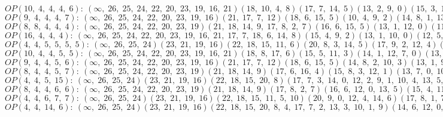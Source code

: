 $OP(10, \;4, \;4, \;4, \;6): \:(\infty, \;26, \;25, \;24, \;22, \;20, \;23, \;19, \;16, \;21)(18, \;10, \;4, \;8)(17, \;7, \;14, \;5)(13, \;2, \;9, \;0)(15, \;3, \;11, \;6, \;12, \;1)$\\
$OP(9, \;4, \;4, \;4, \;7): \:(\infty, \;26, \;25, \;24, \;22, \;20, \;23, \;19, \;16)(21, \;17, \;7, \;12)(18, \;6, \;15, \;5)(10, \;4, \;9, \;2)(14, \;8, \;1, \;13, \;0, \;11, \;3)$\\
$OP(8, \;8, \;4, \;4, \;4): \:(\infty, \;26, \;25, \;24, \;22, \;20, \;23, \;19)(21, \;18, \;14, \;9, \;17, \;8, \;2, \;7)(16, \;6, \;15, \;5)(13, \;1, \;12, \;0)(11, \;4, \;10, \;3)$\\
$OP(16, \;4, \;4, \;4): \:(\infty, \;26, \;25, \;24, \;22, \;20, \;23, \;19, \;16, \;21, \;17, \;7, \;18, \;6, \;14, \;8)(15, \;4, \;9, \;2)(13, \;1, \;10, \;0)(12, \;5, \;11, \;3)$\\
$OP(4, \;4, \;5, \;5, \;5, \;5): \:(\infty, \;26, \;25, \;24)(23, \;21, \;19, \;16)(22, \;18, \;15, \;11, \;6)(20, \;8, \;3, \;14, \;5)(17, \;9, \;2, \;12, \;4)(13, \;7, \;1, \;10, \;0)$\\
$OP(10, \;4, \;4, \;5, \;5): \:(\infty, \;26, \;25, \;24, \;22, \;20, \;23, \;19, \;16, \;21)(18, \;8, \;17, \;6)(15, \;5, \;11, \;3)(14, \;1, \;12, \;7, \;0)(13, \;9, \;2, \;10, \;4)$\\
$OP(9, \;4, \;4, \;5, \;6): \:(\infty, \;26, \;25, \;24, \;22, \;20, \;23, \;19, \;16)(21, \;17, \;7, \;12)(18, \;6, \;15, \;5)(14, \;8, \;2, \;10, \;3)(13, \;1, \;9, \;4, \;11, \;0)$\\
$OP(8, \;4, \;4, \;5, \;7): \:(\infty, \;26, \;25, \;24, \;22, \;20, \;23, \;19)(21, \;18, \;14, \;9)(17, \;6, \;16, \;4)(15, \;8, \;3, \;12, \;1)(13, \;7, \;0, \;10, \;2, \;11, \;5)$\\
$OP(4, \;4, \;5, \;15): \:(\infty, \;26, \;25, \;24)(23, \;21, \;19, \;16)(22, \;18, \;15, \;20, \;8)(17, \;7, \;3, \;14, \;0, \;12, \;2, \;9, \;1, \;10, \;4, \;13, \;5, \;11, \;6)$\\
$OP(8, \;4, \;4, \;6, \;6): \:(\infty, \;26, \;25, \;24, \;22, \;20, \;23, \;19)(21, \;18, \;14, \;9)(17, \;8, \;2, \;7)(16, \;6, \;12, \;0, \;13, \;5)(15, \;4, \;11, \;3, \;10, \;1)$\\
$OP(4, \;4, \;6, \;7, \;7): \:(\infty, \;26, \;25, \;24)(23, \;21, \;19, \;16)(22, \;18, \;15, \;11, \;5, \;10)(20, \;9, \;0, \;12, \;4, \;14, \;6)(17, \;8, \;1, \;7, \;2, \;13, \;3)$\\
$OP(4, \;4, \;14, \;6): \:(\infty, \;26, \;25, \;24)(23, \;21, \;19, \;16)(22, \;18, \;15, \;20, \;8, \;4, \;17, \;7, \;2, \;13, \;3, \;10, \;1, \;9)(14, \;6, \;12, \;0, \;11, \;5)$\\
